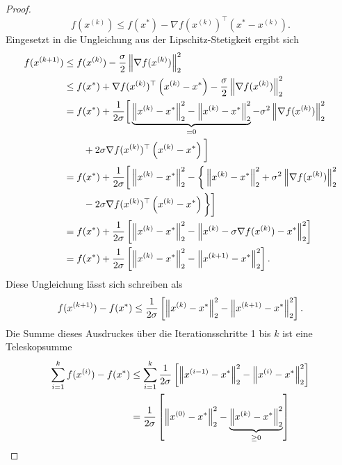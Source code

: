 \begin{proof}
\begin{equation*}
        f(x^{(k)}) \leq f(x^\ast) - \nabla f(x^{(k)})^\top \left(x^\ast - x^{(k)}\right) \text{.}
      \end{equation*}
      Eingesetzt in die Ungleichung aus der Lipschitz-Stetigkeit ergibt sich
      \begin{gather*}
        			\begin{aligned}
                f(x^{(k+1)}) &  \leq f(x^{(k)}) - \frac{\sigma}{2} \left\lVert\nabla f(x^{(k)})\right\rVert^2_2 \\
                & \leq f(x^\ast) + \nabla f(x^{(k)})^\top \left(x^{(k)}-x^\ast\right) - \frac{\sigma}{2} \left\lVert\nabla f(x^{(k)})\right\rVert^2_2\\
                & = f(x^\ast) + \frac{1}{2\sigma} \bigg[ \underbrace{\left\lVert x^{(k)}-x^\ast\right\rVert^2_2-\left\lVert x^{(k)}-x^\ast\right\rVert^2_2}_{=0} - \sigma^2 \left\lVert\nabla f(x^{(k)})\right\rVert^2_2 \\
                & \qquad + 2\sigma \nabla f(x^{(k)})^\top \left(x^{(k)}-x^\ast\right) \bigg] \\
                & = f(x^\ast) + \frac{1}{2\sigma} \bigg[ \left\lVert x^{(k)}-x^\ast\right\rVert^2_2- \bigg\{ \left\lVert x^{(k)}-x^\ast\right\rVert^2_2 + \sigma^2 \left\lVert\nabla f(x^{(k)})\right\rVert^2_2 \\
                & \qquad - 2\sigma \nabla f(x^{(k)})^\top \left(x^{(k)}-x^\ast\right) \bigg\} \bigg] \\
                & = f(x^\ast) + \frac{1}{2\sigma} \left[ \left\lVert x^{(k)}-x^\ast\right\rVert^2_2 - \left\lVert x^{(k)}-\sigma \nabla f(x^{(k)})-x^\ast\right\rVert^2_2\right] \\
                & = f(x^\ast) + \frac{1}{2\sigma} \left[ \left\lVert x^{(k)}-x^\ast\right\rVert^2_2 - \left\lVert x^{(k+1)}-x^\ast\right\rVert^2_2\right] \text{.}\\
        			\end{aligned}
      	\end{gather*}
        Diese Ungleichung lässt sich schreiben als
        \begin{equation*}
          f(x^{(k+1)})-f(x^\ast) \leq \frac{1}{2\sigma} \left[ \left\lVert x^{(k)}-x^\ast\right\rVert^2_2 - \left\lVert x^{(k+1)}-x^\ast\right\rVert^2_2\right] \text{.} \end{equation*}
        Die Summe dieses Ausdruckes über die Iterationsschritte 1 bis $k$ ist eine Teleskopsumme
        \begin{gather*}
          			\begin{aligned}
                  \sum_{i=1}^k f(x^{(i)})-f(x^\ast) & \leq \sum_{i=1}^k \frac{1}{2\sigma} \left[ \norm{x^{(i-1)}-x^\ast}^2_2 - \norm{x^{(i)}-x^\ast}^2_2\right] \\
                  & = \frac{1}{2\sigma} \left[ \norm{x^{(0)}-x^\ast}^2_2 - \underbrace{\norm{x^{(k)}-x^\ast}^2_2}_{\geq 0}\right] \\

\end{aligned}
\end{gather*}
\end{proof}
